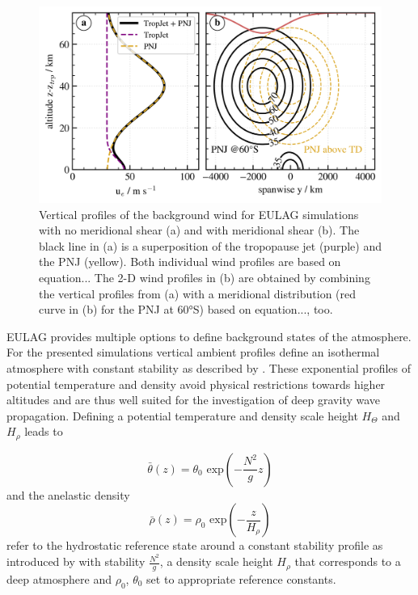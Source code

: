 \begin{figure}[tbp]
    \centering
    \includegraphics[]{figures_model/eulag-wind-profiles.png}
    \caption{Vertical profiles of the background wind for EULAG simulations with no meridional shear (a) and with meridional shear (b). The black line in (a) is a superposition of the tropopause jet (purple) and the PNJ (yellow). Both individual wind profiles are based on equation... The 2-D wind profiles in (b) are obtained by combining the vertical profiles from (a) with a meridional distribution (red curve in (b) for the PNJ at 60°S) based on equation..., too.}
    \label{fig:wind_profs}
\end{figure} 


EULAG provides multiple options to define background states of the atmosphere. For the presented simulations vertical ambient profiles define an isothermal atmosphere with constant stability as described by \textcite{bacmeister_breakdown_1989}. These exponential profiles of potential temperature and density avoid physical restrictions towards higher altitudes and are thus well suited for the investigation of deep gravity wave propagation. Defining a potential temperature and density scale height $H_{\Theta}$ and $H_{\rho}$ leads to


\begin{equation}
    \bar{\theta}(z) = \theta_0 \textrm{ exp}(-\frac{N^2}{g} z) 
    \label{equ:thetaScale}
\end{equation}
%
and the anelastic density 
%
\begin{equation}
    \bar{\rho}(z) = \rho_0 \textrm{ exp}(-\frac{z}{H_{\rho}})
    \label{equ:densityScale}
\end{equation}
refer to the hydrostatic reference state around a constant stability profile as introduced by \textcite{bacmeister_breakdown_1989} with stability $\frac{N^2}{g}$, a density scale height $H_{\rho}$ that corresponds to a deep atmosphere and $\rho_0$, $\theta_0$ set to appropriate reference constants.


